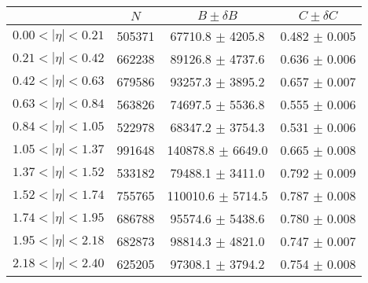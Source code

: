 \begin{tabular}{lccc}
\hline
    &   $N$   & $B \pm \delta B$  &  $C \pm \delta C$ \\
\hline
$0.00 < |\eta| <0.21$          & 505371     & 67710.8    $\pm$ 4205.8 & 0.482      $\pm$ 0.005 \\
$0.21 < |\eta| <0.42$          & 662238     & 89126.8    $\pm$ 4737.6 & 0.636      $\pm$ 0.006 \\
$0.42 < |\eta| <0.63$          & 679586     & 93257.3    $\pm$ 3895.2 & 0.657      $\pm$ 0.007 \\
$0.63 < |\eta| <0.84$          & 563826     & 74697.5    $\pm$ 5536.8 & 0.555      $\pm$ 0.006 \\
$0.84 < |\eta| <1.05$          & 522978     & 68347.2    $\pm$ 3754.3 & 0.531      $\pm$ 0.006 \\
$1.05 < |\eta| <1.37$          & 991648     & 140878.8   $\pm$ 6649.0 & 0.665      $\pm$ 0.008 \\
$1.37 < |\eta| <1.52$          & 533182     & 79488.1    $\pm$ 3411.0 & 0.792      $\pm$ 0.009 \\
$1.52 < |\eta| <1.74$          & 755765     & 110010.6   $\pm$ 5714.5 & 0.787      $\pm$ 0.008 \\
$1.74 < |\eta| <1.95$          & 686788     & 95574.6    $\pm$ 5438.6 & 0.780      $\pm$ 0.008 \\
$1.95 < |\eta| <2.18$          & 682873     & 98814.3    $\pm$ 4821.0 & 0.747      $\pm$ 0.007 \\
$2.18 < |\eta| <2.40$          & 625205     & 97308.1    $\pm$ 3794.2 & 0.754      $\pm$ 0.008 \\
\hline
\end{tabular}
